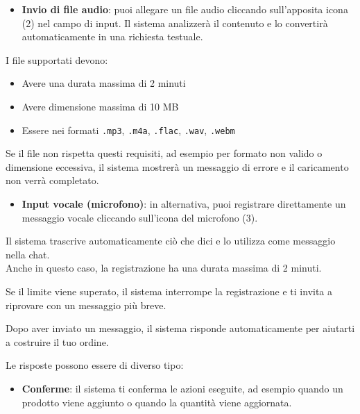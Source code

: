 \begin{itemize}[itemsep=5pt, parsep=5pt, label=$\scriptstyle\bullet$]
	\item \textbf{Invio di file audio}: puoi allegare un file audio cliccando sull'apposita icona (2) nel campo di input. Il sistema analizzer\`a il contenuto e lo convertir\`a automaticamente in una richiesta testuale.
\end{itemize}

I file supportati devono:
\begin{itemize}[itemsep=5pt, parsep=5pt, label=$\scriptstyle\bullet$]
	\item Avere una durata massima di 2 minuti
	\item Avere dimensione massima di 10 MB
	\item Essere nei formati \texttt{.mp3}, \texttt{.m4a}, \texttt{.flac}, \texttt{.wav}, \texttt{.webm}
\end{itemize}

Se il file non rispetta questi requisiti, ad esempio per formato non valido o dimensione eccessiva, il sistema mostrer\`a un messaggio di errore e il caricamento non verr\`a completato.

\begin{itemize}[itemsep=5pt, parsep=5pt, label=$\scriptstyle\bullet$]
	\item \textbf{Input vocale (microfono)}: in alternativa, puoi registrare direttamente un messaggio vocale cliccando sull'icona del microfono (3).
\end{itemize}

Il sistema trascrive automaticamente ci\`o che dici e lo utilizza come messaggio nella chat.\\
Anche in questo caso, la registrazione ha una durata massima di 2 minuti.

Se il limite viene superato, il sistema interrompe la registrazione e ti invita a riprovare con un messaggio pi\`u breve.


Dopo aver inviato un messaggio, il sistema risponde automaticamente per aiutarti a costruire il tuo ordine.

Le risposte possono essere di diverso tipo:

\begin{itemize}[itemsep=5pt, parsep=5pt, label=$\scriptstyle\bullet$]
	\item \textbf{Conferme}: il sistema ti conferma le azioni eseguite, ad esempio quando un prodotto viene aggiunto o quando la quantit\`a viene aggiornata.
\end{itemize}

